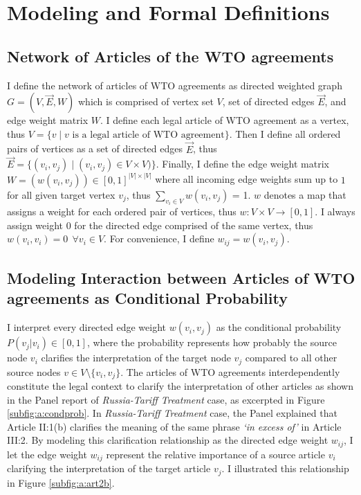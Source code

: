\section{Modeling and Formal Definitions}
\subsection{Network of Articles of the WTO agreements \label{subsec:def}}
 
I define the network of articles of WTO agreements as directed weighted graph $G=(V, \vec{E}, W)$ which is comprised of
vertex set $V$, set of directed edges $\vec{E}$, and edge weight matrix $W$. I define each legal article of WTO agreement as a vertex, thus
$V=\{v \mid v\text{ is a legal article of WTO agreement\}}$. Then I define all ordered pairs of vertices as a set of directed edges $\vec{E}$, thus
$\vec{E} = \{(v_i, v_j) \mid (v_i, v_j)\in V \times V)\}$.
Finally, I define the edge weight matrix $W=(w(v_i, v_j)) \in [0,1]^{|V| \times |V|}$ where all incoming edge weights sum up to $1$ for all given target vertex $v_j$, thus
$\sum_{v_i\in V}{w(v_i, v_j)}$ = 1. $w$ denotes a map that assigns a weight for each ordered pair of vertices, thus $w : V \times V \to [0,1]$.
I always assign weight $0$ for the directed edge comprised of the same vertex, thus  $w(v_i, v_i) = 0 \:\: \forall{v_i \in V}$.
For convenience, I define $w_{ij} = w(v_i, v_j)$.
 
 
\subsection{Modeling Interaction between Articles of WTO agreements as Conditional Probability}
I interpret every directed edge weight $w(v_i, v_j)$ as the conditional probability $P(v_j|v_i) \in [0,1]$, where the probability represents how probably the source node $v_i$ clarifies the interpretation of the target node $v_j$ compared to all other source nodes $v\in V \setminus \{v_i, v_{j}\}$.
The articles of WTO agreements interdependently constitute the legal context to clarify the interpretation of other articles as shown in the Panel report of \textit{Russia-Tariff Treatment} case, as excerpted in Figure \ref{subfig:a:condprob}. In \textit{Russia-Tariff Treatment} case, the Panel explained that Article II:1(b) clarifies the meaning of the same phrase \textit{`in excess of'} in Article III:2.
By modeling this clarification relationship as the directed edge weight $w_{ij}$, I let the edge weight $w_{ij}$ represent the relative importance of a source article $v_i$ clarifying the interpretation of the target article $v_j$. I illustrated this relationship in Figure \ref{subfig:a:art2b}.
 
